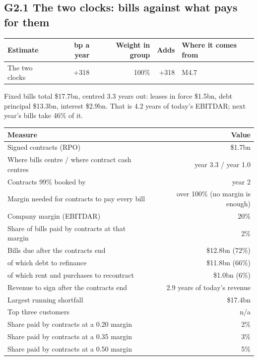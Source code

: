 \documentclass[11pt,a4paper]{article}
\begin{document}
\subsection*{G2.1 The two clocks: bills against what pays for them}
\par\noindent{}
\begin{center}\footnotesize\setlength{\tabcolsep}{3.5pt}\begin{tabular}{@{}p{6.2cm}rrrp{4.2cm}@{}}\toprule
Estimate & bp a year & Weight in group & Adds & Where it comes from \\\midrule
The two clocks & +318 & 100\% & +318 & M4.7 \\
\bottomrule\end{tabular}\end{center}
Fixed bills total \$17.7bn, centred 3.3 years out: leases in force \$1.5bn, debt principal \$13.3bn, interest \$2.9bn. That is 4.2 years of today's EBITDAR; next year's bills take 46\% of it.
\begin{center}\footnotesize\setlength{\tabcolsep}{3.5pt}\begin{tabular}{@{}lr@{}}\toprule
Measure & Value \\\midrule
Signed contracts (RPO) & \$1.7bn \\
Where bills centre / where contract cash centres & year 3.3 / year 1.0 \\
Contracts 99\% booked by & year 2 \\
Margin needed for contracts to pay every bill & over 100\% (no margin is enough) \\
Company margin (EBITDAR) & 20\% \\
Share of bills paid by contracts at that margin & 2\% \\
Bills due after the contracts end & \$12.8bn (72\%) \\
\quad of which debt to refinance & \$11.8bn (66\%) \\
\quad of which rent and purchases to recontract & \$1.0bn (6\%) \\
Revenue to sign after the contracts end & 2.9 years of today's revenue \\
Largest running shortfall & \$17.4bn \\
Top three customers & n/a \\
Share paid by contracts at a 0.20 margin & 2\% \\
Share paid by contracts at a 0.35 margin & 3\% \\
Share paid by contracts at a 0.50 margin & 5\% \\
\bottomrule\end{tabular}\end{center}
\end{document}
